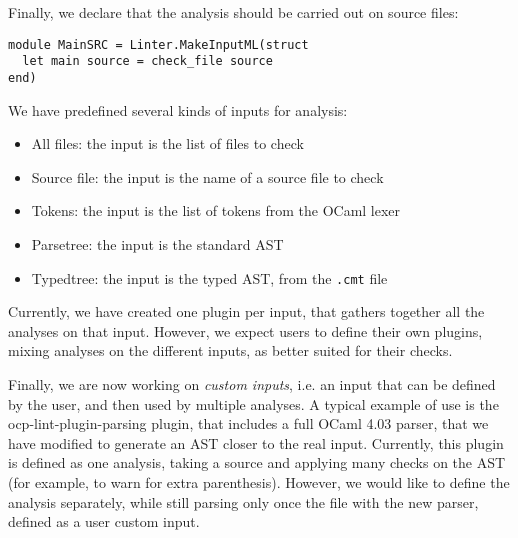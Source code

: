 Finally, we declare that the analysis should be
carried out on source files:
\noindent\begin{lstlisting}[language=caml]
module MainSRC = Linter.MakeInputML(struct
  let main source = check_file source
end)
\end{lstlisting}

We have predefined several kinds of inputs for analysis:
\begin{itemize}
\item All files: the input is the list of files to check
\item Source file: the input is the name of a source file to check
\item Tokens: the input is the list of tokens from the OCaml lexer
\item Parsetree: the input is the standard AST
\item Typedtree: the input is the typed AST, from the \verb-.cmt- file
\end{itemize}

Currently, we have created one plugin per input, that gathers together
all the analyses on that input. However, we expect users to define
their own plugins, mixing analyses on the different inputs, as better
suited for their checks.

Finally, we are now working on \emph{custom inputs}, i.e. an input
that can be defined by the user, and then used by multiple analyses.
A typical example of use is the {\sf ocp-lint-plugin-parsing} plugin,
that includes a full OCaml 4.03 parser, that we have modified to
generate an AST closer to the real input. Currently, this plugin is
defined as one analysis, taking a source and applying many checks on
the AST (for example, to warn for extra parenthesis). However, we
would like to define the analysis separately, while still parsing only
once the file with the new parser, defined as a user custom input.
